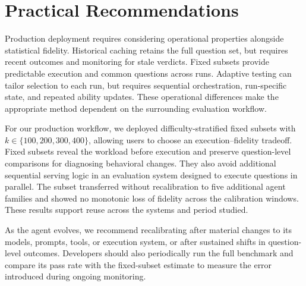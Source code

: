 \section{Practical Recommendations}
\label{sec:discussion}

Production deployment requires considering
operational properties alongside statistical fidelity. Historical caching
retains the full question set, but requires recent outcomes and monitoring for stale verdicts. Fixed subsets provide predictable
execution and common questions across runs. Adaptive testing can
tailor selection to each run, but requires sequential orchestration,
run-specific state, and repeated ability updates. These operational differences
make the appropriate method dependent on the surrounding evaluation workflow.


For our production workflow, we deployed difficulty-stratified fixed subsets with $k\in\{100,200,300,400\}$, allowing users to choose an execution--fidelity tradeoff. 
Fixed subsets reveal the workload
before execution and preserve question-level comparisons for diagnosing
behavioral changes. They also avoid additional sequential serving logic in an evaluation
system designed to execute questions in parallel.
The subset transferred without recalibration to five additional agent families
and showed no monotonic loss of fidelity across the calibration windows. These
results support reuse across the systems and period studied.

As the agent evolves, we recommend recalibrating after material changes to its
models, prompts, tools, or execution system, or after sustained shifts in
question-level outcomes. Developers should also periodically run the full
benchmark and compare its pass rate with the fixed-subset estimate to measure
the error introduced during ongoing monitoring.